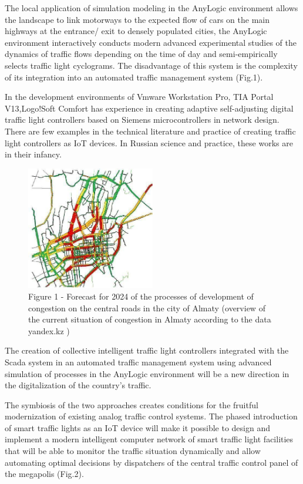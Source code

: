 \begin{multicols}{2}
The local application of simulation modeling in the AnyLogic environment
allows the landscape to link motorways to the expected flow of cars on
the main highways at the entrance/ exit to densely populated cities, the
AnyLogic environment interactively conducts modern advanced experimental
studies of the dynamics of traffic flows depending on the time of day
and semi-empirically selects traffic light cyclograms. The disadvantage
of this system is the complexity of its integration into an automated
traffic management system (Fig.1).

In the development environments of Vmware Workstation Pro, TIA Portal
V13,Logo!Soft Comfort has experience in creating adaptive self-adjusting
digital traffic light controllers based on Siemens microcontrollers in
network design. There are few examples in the technical literature and
practice of creating traffic light controllers as IoT devices. In
Russian science and practice, these works are in their infancy.
\end{multicols}

\begin{figure}[H]
	\centering
	\includegraphics[width=0.5\textwidth]{assets/73}
	\caption*{Figure 1 - Forecast for 2024 of the processes of development of congestion on the central roads in the city of Almaty (overview of the current situation of congestion in Almaty according to the data yandex.kz )}
\end{figure}

\begin{multicols}{2}
The creation of collective intelligent traffic light controllers
integrated with the Scada system in an automated traffic management
system using advanced simulation of processes in the AnyLogic
environment will be a new direction in the digitalization of the
country's traffic.

The symbiosis of the two approaches creates conditions for the fruitful
modernization of existing analog traffic control systems. The phased
introduction of smart traffic lights as an IoT device will make it
possible to design and implement a modern intelligent computer network
of smart traffic light facilities that will be able to monitor the
traffic situation dynamically and allow automating optimal decisions by
dispatchers of the central traffic control panel of the megapolis
(Fig.2).
\end{multicols}

